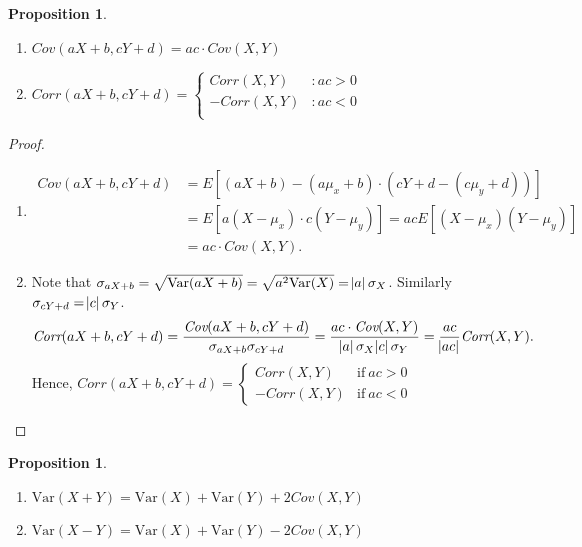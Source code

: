 \documentclass[12pt,openany]{book}
\newtheorem{proposition}[theorem]{Proposition}
\theoremstyle{definition}
\newcommand{\Var}{\text{Var}}
\newcommand{\Cov}{\textit{Cov}}
\newcommand{\Corr}{\textit{Corr}}
\begin{document}
	\vspace{10pt}
	\begin{tcolorbox}[colback=white,colframe=procolor,arc=5pt,title={\color{white}\bf }]
		\begin{proposition}
			 \ \begin{enumerate}[(1)]
				\item \(\Cov(aX+b,cY+d) = ac\cdot\Cov(X,Y) \)
				\item \(\Corr(aX+b,cY+d)=\begin{cases}
					\Corr(X,Y) &: ac>0 \\
					-\Corr(X,Y) &: ac<0 \\
				\end{cases} \)
			\end{enumerate}
		\end{proposition}
	\end{tcolorbox}
	\begin{proof}
		\begin{enumerate}[(1)]
			\item \begin{align*}
				\Cov(aX+b,cY+d) &= E[(aX+b)-(a\mu_x+b)\cdot(cY+d-(c\mu_y+d))] \\
				&= E[a(X-\mu_x)\cdot c(Y-\mu_y)]
				= acE[(X-\mu_x)(Y-\mu_y)] \\
				&= ac\cdot\Cov(X,Y).
			\end{align*}
			\item Note that $\sigma_{aX+b}=\sqrt{\Var(aX+b)}=\sqrt{a^2\Var(X)}=\abs{a}\sigma_X$. Similarly $\sigma_{cY+d}=\abs{c}\sigma_Y$.\begin{align*}
				\Corr(aX+b,cY+d) = \frac{\Cov(aX+b,cY+d)}{\sigma_{aX+b}\sigma_{cY+d}} 
				= \frac{ac\cdot\Cov(X,Y)}{\abs{a}\sigma_X\abs{c}\sigma_Y}
				= \frac{ac}{\abs{ac}}\Corr(X,Y).
			\end{align*} Hence, $\Corr(aX+b,cY+d)=\begin{cases}
				\Corr(X,Y) &\text{if}\ ac>0 \\
				-\Corr(X,Y) &\text{if}\ ac<0
			\end{cases}$
		\end{enumerate}
	\end{proof}
	\begin{tcolorbox}[colback=white,colframe=procolor,arc=5pt,title={\color{white}\bf Distribution of Sum of Two Probability Variables}]
		\begin{proposition}
			\ \begin{enumerate}[(1)]
				\item \(\Var(X+Y)=\Var(X)+\Var(Y)+2\Cov(X,Y) \)
				\item \(\Var(X-Y)=\Var(X)+\Var(Y)-2\Cov(X,Y) \)
			\end{enumerate}	
		\end{proposition}
	\end{tcolorbox}
\end{document}
